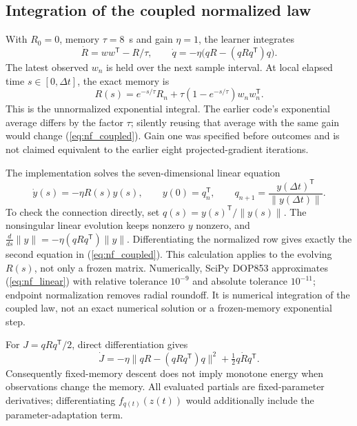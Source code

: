 \subsection{Integration of the coupled normalized law}
With $R_0=0$, memory $\tau=8$~s and gain $\eta=1$, the learner integrates
\begin{equation}
 \dot R=ww^{\mathsf T}-R/\tau,\qquad
 \dot q=-\eta\bigl(qR-(qRq^{\mathsf T})q\bigr).
 \label{eq:nf_coupled}
\end{equation}
The latest observed $w_n$ is held over the next sample interval. At local
elapsed time $s\in[0,\Delta t]$, the exact memory is
\begin{equation}
 R(s)=e^{-s/\tau}R_n+\tau(1-e^{-s/\tau})w_nw_n^{\mathsf T}.
 \label{eq:nf_memory}
\end{equation}
This is the unnormalized exponential integral. The earlier code's
exponential average differs by the factor $\tau$; silently reusing that
average with the same gain would change (\ref{eq:nf_coupled}).
Gain one was specified before outcomes and is not claimed equivalent to
the earlier eight projected-gradient iterations.

The implementation solves the seven-dimensional linear equation
\begin{equation}
 \dot y(s)=-\eta R(s)y(s),\qquad y(0)=q_n^{\mathsf T},\qquad
 q_{n+1}=\frac{y(\Delta t)^{\mathsf T}}{\|y(\Delta t)\|}.
 \label{eq:nf_linear}
\end{equation}
To check the connection directly, set $q(s)=y(s)^{\mathsf T}/\|y(s)\|$.
The nonsingular linear evolution keeps nonzero $y$ nonzero, and
$\frac{d}{ds}\|y\|=-\eta(qRq^{\mathsf T})\|y\|$.
Differentiating the normalized row gives exactly the second equation in
(\ref{eq:nf_coupled}). This calculation applies to the evolving $R(s)$,
not only a frozen matrix. Numerically, SciPy DOP853 approximates
(\ref{eq:nf_linear}) with relative tolerance $10^{-9}$ and absolute
tolerance $10^{-11}$; endpoint normalization removes radial roundoff.
It is numerical integration of the coupled law, not an exact numerical
solution or a frozen-memory exponential step.

For $J=qRq^{\mathsf T}/2$, direct differentiation gives
\begin{equation}
 \dot J=-\eta\|qR-(qRq^{\mathsf T})q\|^2
               +\tfrac12q\dot Rq^{\mathsf T}.
 \label{eq:nf_moving_energy}
\end{equation}
Consequently fixed-memory descent does not imply monotone energy when
observations change the memory. All evaluated partials are fixed-parameter
derivatives; differentiating $f_{q(t)}(z(t))$ would additionally include
the parameter-adaptation term.

